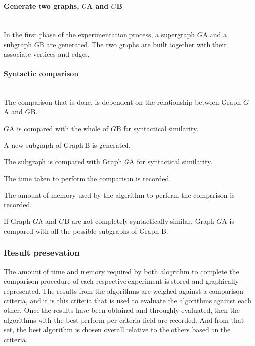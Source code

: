 \paragraph{Generate two graphs, $G${\tiny A} and $G${\tiny B}}\mbox{}\\
In the first phase of the experimentation process, a supergraph $G${\tiny A} and a subgraph $G${\tiny B} are generated. The two graphs are built together 
with their associate vertices and edges.
\paragraph{Syntactic comparison}\mbox{}\\
The comparison that is done, is dependent on the relationship between Graph $G${\tiny A} and $G${\tiny B}.
\begin{myEnumerate}
\item $G${\tiny A} is compared with the whole of $G${\tiny B} for syntactical similarity.										
\begin{myEnumerate}
\item A new subgraph of Graph B is generated.
\item The subgraph is compared with Graph $G${\tiny A} for syntactical similarity.											
\begin{myEnumerate}
\item The time taken to perform the comparison is recorded.
\item The amount of memory used by the algorithm to perform the comparison is recorded.
\end{myEnumerate}
\end{myEnumerate}
\item If Graph $G${\tiny A} and $G${\tiny B} are not completely syntactically similar, Graph $G${\tiny A} is compared with all the possible subgraphs of Graph B.
\end{myEnumerate}

\subsubsection{Result presevation}
The amount of time and memory required by both alogrithm to complete the comparison procedure of each respective experiment is stored and graphically represented. 
The results from the algorithms are weighed against a comparison criteria, and it is this criteria that is used to evaluate the algorithms against each other.\newline\newline
Once the results have been obtained and throughly evaluated, then the algorithms with the best perform per criteria field are recorded.\newline\newline
And from that set, the best algorithm is chosen overall relative to the others based on the criteria.\newpage